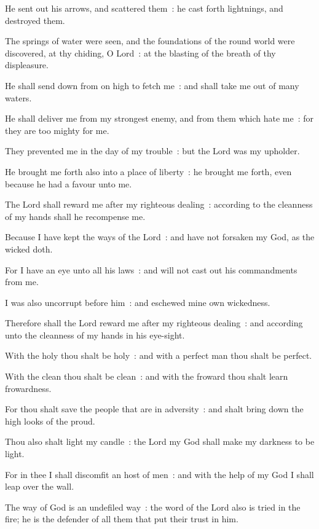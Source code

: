 He sent out his arrows, and scattered them~: he cast forth lightnings, and destroyed them.\par
{}The springs of water were seen, and the foundations of the round world were discovered, at thy chiding, O Lord~: at the blasting of the breath of thy displeasure.\par
{}He shall send down from on high to fetch me~: and shall take me out of many waters.\par
{}He shall deliver me from my strongest enemy, and from them which hate me~: for they are too mighty for me.\par
{}They prevented me in the day of my trouble~: but the Lord was my upholder.\par
{}He brought me forth also into a place of liberty~: he brought me forth, even because he had a favour unto me.\par
{}The Lord shall reward me after my righteous dealing~: according to the cleanness of my hands shall he recompense me.\par
{}Because I have kept the ways of the Lord~: and have not forsaken my God, as the wicked doth.\par
{}For I have an eye unto all his laws~: and will not cast out his commandments from me.\par
{}I was also uncorrupt before him~: and eschewed mine own wickedness.\par
{}Therefore shall the Lord reward me after my righteous dealing~: and according unto the cleanness of my hands in his eye-sight.\par
{}With the holy thou shalt be holy~: and with a perfect man thou shalt be perfect.\par
{}With the clean thou shalt be clean~: and with the froward thou shalt learn frowardness.\par
{}For thou shalt save the people that are in adversity~: and shalt bring down the high looks of the proud.\par
{}Thou also shalt light my candle~: the Lord my God shall make my darkness to be light.\par
{}For in thee I shall discomfit an host of men~: and with the help of my God I shall leap over the wall.\par
{}The way of God is an undefiled way~: the word of the Lord also is tried in the fire; he is the defender of all them that put their trust in him.\par
